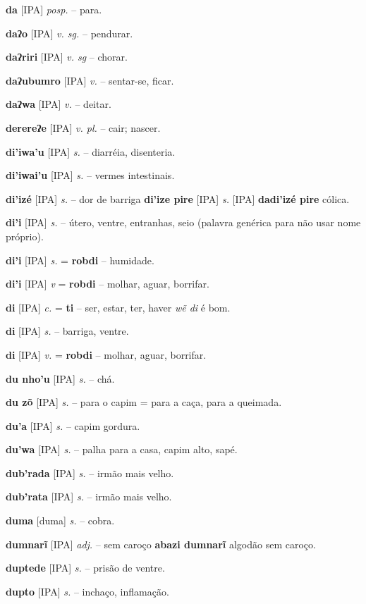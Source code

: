 \textbf{da} [IPA] \textit{posp.} -- para.

\textbf{daʔo} [IPA] \textit{v. sg.} -- pendurar.

\textbf{daʔriri} [IPA] \textit{v. sg} -- chorar.

\textbf{daʔubumro} [IPA] \textit{v.} -- sentar-se, ficar.

\textbf{daʔwa} [IPA] \textit{v.} -- deitar.

\textbf{derereʔe} [IPA] \textit{v. pl.} -- cair; nascer.

\textbf{di'iwa'u} [IPA] \textit{s.} -- diarréia, disenteria.

\textbf{di'iwai'u} [IPA] \textit{s.} -- vermes intestinais.

\textbf{di'izé} [IPA] \textit{s.} -- dor de barriga  \textbf{di'ize pire} [IPA] \textit{s.} [IPA] \textbf{dadi'izé pire} cólica.

\textbf{di'i} [IPA] \textit{s.} -- útero, ventre, entranhas, seio (palavra genérica para não usar nome próprio).

\textbf{di'i} [IPA] \textit{s.} = \textbf{robdi} -- humidade.

\textbf{di'i} [IPA] \textit{v} = \textbf{robdi} -- molhar, aguar, borrifar.

\textbf{di} [IPA] \textit{c.} = \textbf{ti} -- ser, estar, ter, haver  \textit{wẽ di} é bom.

\textbf{di} [IPA] \textit{s.} -- barriga, ventre.

\textbf{di} [IPA] \textit{v.} = \textbf{robdi} -- molhar, aguar, borrifar.

\textbf{du nho'u} [IPA] \textit{s.} -- chá.

\textbf{du zõ} [IPA] \textit{s.} -- para o capim = para a caça, para a queimada.

\textbf{du'a} [IPA] \textit{s.} -- capim gordura.

\textbf{du'wa} [IPA] \textit{s.} -- palha para a casa, capim alto, sapé.

\textbf{dub'rada} [IPA] \textit{s.} -- irmão mais velho.

\textbf{dub'rata} [IPA] \textit{s.} -- irmão mais velho.

\textbf{duma} [duma] \textit{s.} -- cobra.

\textbf{dumnarĩ} [IPA] \textit{adj.} -- sem caroço  \textbf{abazi dumnarĩ} algodão sem caroço.

\textbf{duptede} [IPA] \textit{s.} -- prisão de ventre.

\textbf{dupto} [IPA] \textit{s.} -- inchaço, inflamação.


